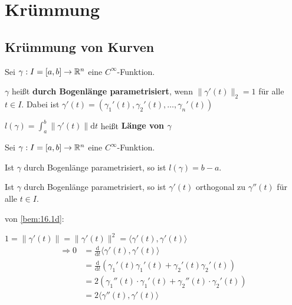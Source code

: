 \chapter{Krümmung}
\section{Krümmung von Kurven}
\begin{definition}%
    Sei $\gamma: I = [a, b] \rightarrow \mathbb{R}^n$ eine $C^\infty$-Funktion.
    
    \begin{defenum}
        \item $\gamma$ heißt \textbf{durch Bogenlänge parametrisiert},
              wenn $\|\gamma'(t)\|_2 = 1$ für alle $t \in I$. Dabei
              ist $\gamma'(t) = \left (\gamma_1'(t), \gamma_2'(t), \dots, \gamma_n'(t) \right)$
        \item $l(\gamma) = \int_a^b \|\gamma'(t)\| \mathrm{d} t$ heißt
              \textbf{Länge von $\gamma$}
    \end{defenum}    
\end{definition}

\begin{bemerkung}%
    Sei $\gamma: I = [a, b] \rightarrow \mathbb{R}^n$ eine $C^\infty$-Funktion.

    \begin{bemenum}
        \item Ist $\gamma$ durch Bogenlänge parametrisiert, so ist $l(\gamma) = b-a$.
        \item \label{bem:16.1d} Ist $\gamma$ durch Bogenlänge parametrisiert, so ist 
              $\gamma'(t)$ orthogonal zu $\gamma''(t)$ für alle $t \in I$.
    \end{bemenum}
\end{bemerkung}

\begin{beweis}
    von \cref{bem:16.1d}:

    $1 = \|\gamma'(t)\| = \|\gamma'(t)\|^2 = \langle \gamma'(t), \gamma'(t) \rangle$\\
    \begin{align*}
        \Rightarrow 0 &= \frac{\mathrm{d}}{\mathrm{d}t} \langle \gamma'(t), \gamma'(t) \rangle\\
                      &= \frac{\mathrm{d}}{\mathrm{d}t} (\gamma_1'(t)\gamma_1'(t) + \gamma_2'(t)\gamma_2'(t))\\
                      &= 2 (\gamma_1''(t) \cdot \gamma_1'(t) + \gamma_2''(t) \cdot \gamma_2'(t))\\
                      &= 2 \langle \gamma''(t), \gamma'(t) \rangle
     \end{align*}
\end{beweis}

